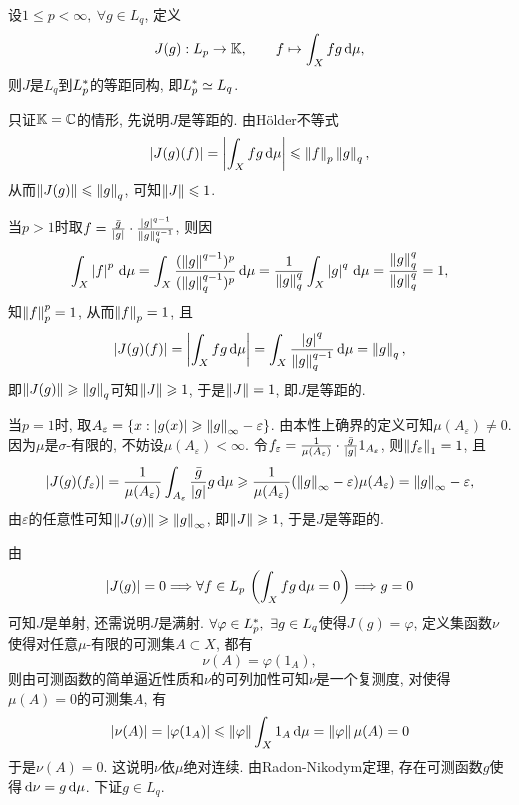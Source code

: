 	\begin{Theorem}
		设$ 1\leqslant p<\infty,\ \forall g\in L_q $, 定义
		\[
		J(g) : L_p\to\mathbb{K},\qquad f\mapsto\int_Xfg\,\mathrm{d}\mu,
		\]
		则$ J $是$ L_q $到$ L_p^{*} $的等距同构, 即$ L_p^{*}\simeq L_q $.
	\end{Theorem}
	\begin{Proof}
		只证$ \mathbb{K}=\mathbb{C} $的情形, 先说明$ J $是等距的. 由H\"older不等式
		\[
		\left| J(g)(f) \right| =\left| \int_Xfg\,\mathrm{d}\mu \right| \leqslant\left\| f \right\|_p\left\| g \right\|_q,
		\]
		从而$ \left\| J(g) \right\|\leqslant\left\| g \right\|_q $, 可知$ \left\| J \right\|\leqslant 1 $.
	
		当$ p>1 $时取$ f=\frac{\bar{g}}{\left| g \right| }\cdot\frac{\left| g \right| ^{q-1}}{\left\| g \right\|_q^{q-1}} $, 则因
		\[
		\int_X\left| f \right| ^p\,\mathrm{d}\mu=\int_X\frac{(\left\| g \right\|^{q-1})^p}{(\left\| g \right\|_q^{q-1})^p}\,\mathrm{d}\mu=\frac{1}{\left\| g \right\|_q^q}\int_X\left| g \right| ^q\,\mathrm{d}\mu=\frac{\left\| g \right\|_q^q}{\left\| g \right\|_q^q}=1,
		\]
		知$ \left\| f \right\|_p^p=1 $, 从而$ \left\| f \right\|_p=1 $, 且
		\[
		\left| J(g)(f) \right| =\left| \int_Xfg\,\mathrm{d}\mu \right| =\int_X\frac{\left| g \right| ^q}{\left\| g \right\|_q^{q-1}}\,\mathrm{d}\mu=\left\| g \right\|_q,
		\]
		即$ \left\| J(g) \right\|\geqslant\left\| g \right\|_q $可知$ \left\| J \right\|\geqslant 1 $, 于是$ \left\| J \right\|=1 $, 即$ J $是等距的.
	
		当$ p=1 $时, 取$ A_\varepsilon=\{ x : \left| g(x) \right| \geqslant\left\| g \right\|_\infty-\varepsilon \} $. 由本性上确界的定义可知$ \mu(A_\varepsilon)\ne 0 $. 因为$ \mu $是$ \sigma $-有限的, 不妨设$ \mu(A_\varepsilon)<\infty $. 令$ f_\varepsilon=\frac{1}{\mu(A_\varepsilon)}\cdot\frac{\bar{g}}{\left| g \right| }1_{A_\varepsilon} $, 则$ \left\| f_\varepsilon \right\|_1=1 $, 且
		\[
		\left| J(g)(f_\varepsilon) \right| =\frac{1}{\mu(A_\varepsilon)}\int_{A_\varepsilon}\frac{\bar{g}}{\left| g \right| }g\,\mathrm{d}\mu\geqslant\frac{1}{\mu(A_\varepsilon)}(\left\| g \right\|_\infty-\varepsilon)\mu(A_\varepsilon)=\left\| g \right\|_\infty-\varepsilon,
		\]
		由$ \varepsilon $的任意性可知$ \left\| J(g) \right\|\geqslant\left\| g \right\|_\infty $, 即$ \left\| J \right\|\geqslant 1 $, 于是$ J $是等距的.
	
		由
		\[
		\left| J(g) \right| =0\Longrightarrow\forall f\in L_p\,\left(\int_Xfg\,\mathrm{d}\mu=0\right)\Longrightarrow g=0
		\]
		可知$ J $是单射, 还需说明$ J $是满射. $ \forall \varphi\in L_p^{*},\ \exists g\in L_q $使得$ J(g)=\varphi $, 定义集函数$ \nu $使得对任意$ \mu $-有限的可测集$ A\subset X $, 都有
		\[
		\nu(A)=\varphi(1_A),
		\]
		则由可测函数的简单逼近性质和$ \nu $的可列加性可知$ \nu $是一个复测度, 对使得$ \mu(A)=0 $的可测集$ A $, 有
		\[
		\left| \nu(A) \right| =\left| \varphi(1_A) \right| \leqslant\left\| \varphi \right\|\int_X1_A\,\mathrm{d}\mu=\left\| \varphi \right\|\mu(A)=0
		\]
		于是$ \nu(A)=0 $. 这说明$ \nu $依$ \mu $绝对连续. 由Radon-Nikodym定理, 存在可测函数$ g $使得$ \,\mathrm{d}\nu=g\,\mathrm{d}\mu $. 下证$ g\in L_q $.
	

\end{Proof}
